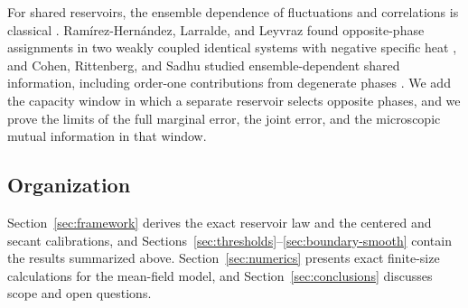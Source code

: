 For shared reservoirs, the ensemble dependence of fluctuations and
correlations is classical \cite{LebowitzPercusVerlet1967,Mishin2015}.
Ram\'irez-Hern\'andez, Larralde, and Leyvraz found opposite-phase
assignments in two weakly coupled identical systems with negative
specific heat \cite{RamirezHernandezLarraldeLeyvraz2008}, and Cohen,
Rittenberg, and Sadhu studied ensemble-dependent shared information,
including order-one contributions from degenerate phases
\cite{CohenRittenbergSadhu2015}. We add the capacity window in which a
separate reservoir selects opposite phases, and we prove the limits of
the full marginal error, the joint error, and the microscopic mutual
information in that window.

\subsection{Organization}

Section~\ref{sec:framework} derives the exact reservoir law and the
centered and secant calibrations, and
Sections~\ref{sec:thresholds}--\ref{sec:boundary-smooth} contain the
results summarized above. Section~\ref{sec:numerics} presents exact
finite-size calculations for the mean-field model, and
Section~\ref{sec:conclusions} discusses scope and open questions.

